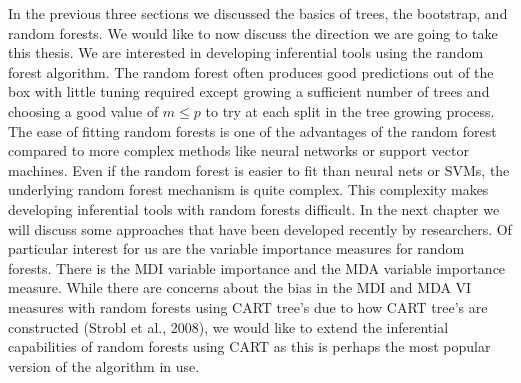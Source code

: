 \documentclass[12pt,twoside]{reedthesis}
\theoremstyle{definition}
\theoremstyle{definition}
\theoremstyle{definition}
\theoremstyle{remark}
\begin{document}
In the previous three sections we discussed the basics of trees, the
bootstrap, and random forests. We would like to now discuss the
direction we are going to take this thesis. We are interested in
developing inferential tools using the random forest algorithm. The
random forest often produces good predictions out of the box with little
tuning required except growing a sufficient number of trees and choosing
a good value of \(m\leq p\) to try at each split in the tree growing
process. The ease of fitting random forests is one of the advantages of
the random forest compared to more complex methods like neural networks
or support vector machines. Even if the random forest is easier to fit
than neural nets or SVMs, the underlying random forest mechanism is
quite complex. This complexity makes developing inferential tools with
random forests difficult. In the next chapter we will discuss some
approaches that have been developed recently by researchers. Of
particular interest for us are the variable importance measures for
random forests. There is the MDI variable importance and the MDA
variable importance measure. While there are concerns about the bias in
the MDI and MDA VI measures with random forests using CART tree's due to
how CART tree's are constructed (Strobl et al., 2008), we would like to
extend the inferential capabilities of random forests using CART as this
is perhaps the most popular version of the algorithm in use.
\end{document}
